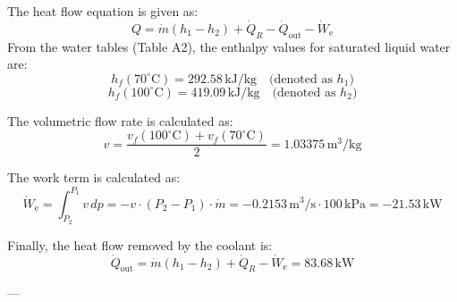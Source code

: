 The heat flow equation is given as:  
\[
Q = \dot{m} (h_1 - h_2) + \dot{Q}_R - \dot{Q}_{\text{out}} - \dot{W}_{\text{e}}
\]  
From the water tables (Table A2), the enthalpy values for saturated liquid water are:  
\[
h_f(70^\circ\text{C}) = 292.58 \, \text{kJ/kg} \quad \text{(denoted as } h_1\text{)}
\]  
\[
h_f(100^\circ\text{C}) = 419.09 \, \text{kJ/kg} \quad \text{(denoted as } h_2\text{)}
\]  

The volumetric flow rate is calculated as:  
\[
v = \frac{v_f(100^\circ\text{C}) + v_f(70^\circ\text{C})}{2} = 1.03375 \, \text{m}^3/\text{kg}
\]  

The work term is calculated as:  
\[
\dot{W}_{\text{e}} = \int_{P_2}^{P_1} v \, dp = -v \cdot (P_2 - P_1) \cdot \dot{m} = -0.2153 \, \text{m}^3/\text{s} \cdot 100 \, \text{kPa} = -21.53 \, \text{kW}
\]  

Finally, the heat flow removed by the coolant is:  
\[
\dot{Q}_{\text{out}} = \dot{m} (h_1 - h_2) + \dot{Q}_R - \dot{W}_{\text{e}} = 83.68 \, \text{kW}
\]  

---